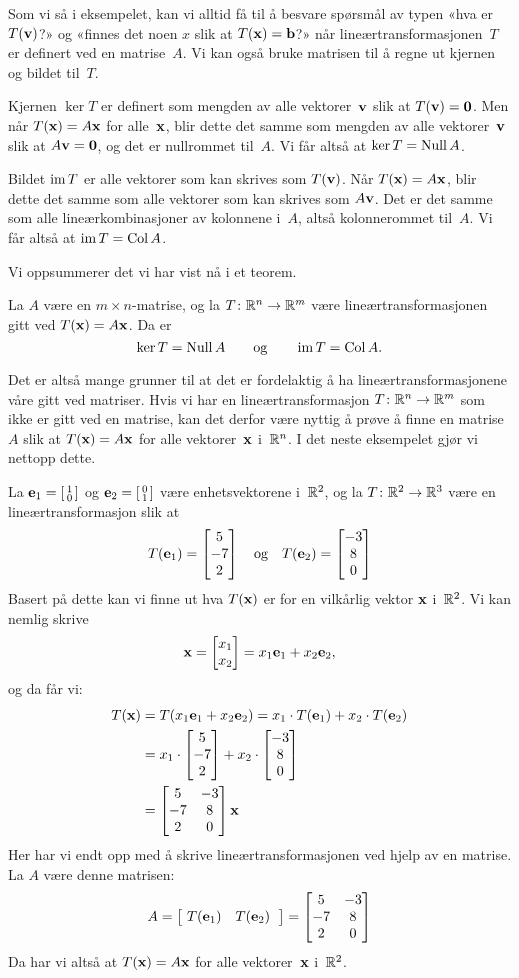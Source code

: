 Som vi så i eksempelet, kan vi alltid få til å besvare spørsmål av
typen «hva er $T(\mathbf{v})$?» og «finnes det noen $x$ slik at $T(\mathbf{x}) = \mathbf{b}$?»
når lineærtransformasjonen~$T$ er definert ved en matrise~$A$.  Vi kan
også bruke matrisen til å regne ut kjernen og bildet til~$T$.

Kjernen $\ker T$ er definert som mengden av alle vektorer~$\mathbf{v}$ slik at
$T(\mathbf{v}) = \mathbf{0}$.  Men når $T(\mathbf{x}) = A\mathbf{x}$ for alle~$\mathbf{x}$, blir dette det
samme som mengden av alle vektorer~$\mathbf{v}$ slik at $A\mathbf{v} = \mathbf{0}$, og det er
nullrommet til~$A$.  Vi får altså at $\ker T = \operatorname{Null} A$.

Bildet $\operatorname{im} T$ er alle vektorer som kan skrives som $T(\mathbf{v})$.  Når
$T(\mathbf{x}) = A\mathbf{x}$, blir dette det samme som alle vektorer som kan skrives
som $A\mathbf{v}$.  Det er det samme som alle lineærkombinasjoner av kolonnene
i~$A$, altså kolonnerommet til~$A$.  Vi får altså at $\operatorname{im} T = \operatorname{Col} A$.

Vi oppsummerer det vi har vist nå i et teorem.

\begin{thm}
La $A$ være en $m \times n$-matrise, og la $T \colon \mathbb{R}^n \to \mathbb{R}^m$
være lineærtransformasjonen gitt ved $T(\mathbf{x}) = A\mathbf{x}$.  Da er
\[
\ker T = \operatorname{Null} A
\qquad\text{og}\qquad
\operatorname{im} T = \operatorname{Col} A.
\]
\end{thm}

Det er altså mange grunner til at det er fordelaktig å ha
lineærtransformasjonene våre gitt ved matriser.  Hvis vi har en
lineærtransformasjon $T \colon \mathbb{R}^n \to \mathbb{R}^m$ som ikke er gitt ved en
matrise, kan det derfor være nyttig å prøve å finne en matrise~$A$
slik at $T(\mathbf{x}) = A\mathbf{x}$ for alle vektorer~$\mathbf{x}$ i~$\mathbb{R}^n$.  I det neste
eksempelet gjør vi nettopp dette.

\begin{ex}
La $\mathbf{e}_1 = \left[ \begin{smallmatrix} 1 \\ 0 \end{smallmatrix} \right]$ og $\mathbf{e}_2 = \left[ \begin{smallmatrix} 0 \\ 1 \end{smallmatrix} \right]$ være enhetsvektorene
i~$\mathbb{R}^2$, og la $T \colon \mathbb{R}^2 \to \mathbb{R}^3$ være en lineærtransformasjon
slik at
\[
T(\mathbf{e}_1) = \begin{bmatrix} 5 \\ -7 \\ 2 \end{bmatrix}
\quad\text{og}\quad
T(\mathbf{e}_2) = \begin{bmatrix} -3 \\ 8 \\ 0 \end{bmatrix}
\]
Basert på dette kan vi finne ut hva $T(\mathbf{x})$ er for en vilkårlig vektor
$\mathbf{x}$ i~$\mathbb{R}^2$.  Vi kan nemlig skrive
\[
\mathbf{x} = \begin{bmatrix} x_1 \\ x_2 \end{bmatrix} = x_1 \mathbf{e}_1 + x_2 \mathbf{e}_2,
\]
og da får vi:
\begin{align*}
T(\mathbf{x})
&= T(x_1 \mathbf{e}_1 + x_2 \mathbf{e}_2)
 = x_1 \cdot T(\mathbf{e}_1) + x_2 \cdot T(\mathbf{e}_2) \\
&= x_1 \cdot \begin{bmatrix} 5 \\ -7 \\ 2 \end{bmatrix} + x_2 \cdot \begin{bmatrix} -3 \\ 8 \\ 0 \end{bmatrix} \\
&=
\begin{bmatrix}
 5 & -3 \\
-7 &  8 \\
 2 &  0
\end{bmatrix}
\mathbf{x}
\end{align*}
Her har vi endt opp med å skrive lineærtransformasjonen ved hjelp av
en matrise.  La $A$ være denne matrisen:
\[
A = \begin{bmatrix} \ T(\e_1) & T(\e_2)\;\ \end{bmatrix}
  =
\begin{bmatrix}
 5 & -3 \\
-7 &  8 \\
 2 &  0
\end{bmatrix}
\]
Da har vi altså at $T(\mathbf{x}) = A\mathbf{x}$ for alle vektorer~$\mathbf{x}$ i~$\mathbb{R}^2$.
\end{ex}

